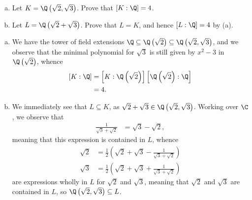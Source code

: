 \documentclass[10pt]{mypackage}
\begin{document}
\begin{problem}[Problem 3]\hfill
  \begin{enumerate}[(a)]
    \item Let $K = \Q\left( \sqrt{2},\sqrt{3} \right)$. Prove that $\left[ K:\Q \right] = 4$.
    \item Let $L = \Q\left( \sqrt{2} + \sqrt{3} \right)$. Prove that $L = K$, and hence $\left[ L:\Q \right] = 4$ by (a).
  \end{enumerate}
\end{problem}
\begin{solution}\hfill
  \begin{enumerate}[(a)]
    \item We have the tower of field extensions $\Q\subseteq \Q\left( \sqrt{2} \right)\subseteq \Q\left( \sqrt{2},\sqrt{3} \right)$, and we observe that the minimal polynomial for $\sqrt{3}$ is still given by $x^2 - 3$ in $\Q\left( \sqrt{2} \right)$, whence
      \begin{align*}
        \left[ K:\Q \right] &= \left[ K:\Q\left( \sqrt{2} \right) \right]\left[ \Q\left( \sqrt{2} \right):\Q \right]\\
                            &=4.
      \end{align*}
    \item We immediately see that $L\subseteq K$, as $\sqrt{2} + \sqrt{3}\in \Q\left( \sqrt{2},\sqrt{3} \right)$. Working over $\C$, we observe that
      \begin{align*}
        \frac{1}{\sqrt{3} + \sqrt{2}} &= \sqrt{3} - \sqrt{2},
      \end{align*}
      meaning that this expression is contained in $L$, whence
      \begin{align*}
        \sqrt{2} &= \frac{1}{2}\left( \sqrt{2} + \sqrt{3} - \frac{1}{\sqrt{3} + \sqrt{2}} \right)\\
        \sqrt{3} &= \frac{1}{2} \left( \sqrt{2} + \sqrt{3} + \frac{1}{\sqrt{3} + \sqrt{2}} \right)
      \end{align*}
      are expressions wholly in $L$ for $\sqrt{2}$ and $\sqrt{3}$, meaning that $\sqrt{2}$ and $\sqrt{3}$ are contained in $L$, so $\Q\left( \sqrt{2},\sqrt{3} \right)\subseteq L$.
  \end{enumerate}
\end{solution}
\end{document}
